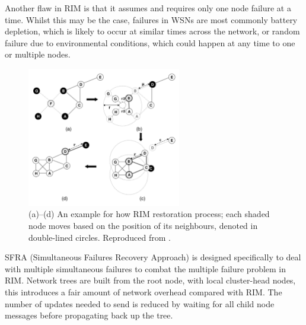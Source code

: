 \documentclass[authoryearcitations]{UoYCSproject}
\begin{document}

Another flaw in RIM is that it assumes and requires only one node failure at a time. Whilst this may be the case, failures in WSNs are most commonly battery depletion, which is likely to occur at similar times across the network, or random failure due to environmental conditions, which could happen at any time to one or multiple nodes.

\begin{figure}
 \centering
    \includegraphics[width=0.6\textwidth]{figures/rim.png}
    \caption[(a)--(d) An example for how RIM restoration process; each shaded node moves based on the position of its neighbours, denoted in double-lined circles.]{(a)--(d) An example for how RIM restoration process; each shaded node moves based on the position of its neighbours, denoted in double-lined circles. Reproduced from \citet{Younis2010}.}
    \label{fig:rim}
\end{figure}



SFRA (Simultaneous Failures Recovery Approach) \citep{Alfadhly2012} is designed specifically to deal with multiple simultaneous failures to combat the multiple failure problem in RIM. Network trees are built from the root node, with local cluster-head nodes, this introduces a fair amount of network overhead compared with RIM. The number of updates needed to send is reduced by waiting for all child node messages before propagating back up the tree.
\end{document}

